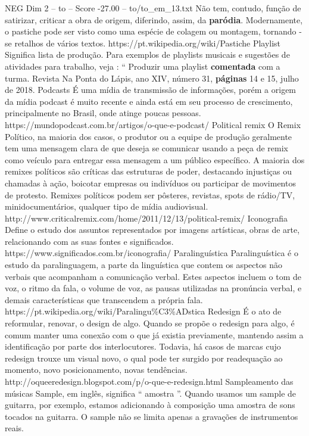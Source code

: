 \begin{textsample}{NEG Dim 2 – to – Score -27.00 – to/to\_em\_13.txt}
Não tem, contudo, função de satirizar, criticar a obra de origem, diferindo, assim, da \textbf{paródia}.
Modernamente, o pastiche pode ser visto como uma espécie de colagem ou montagem, tornando -se retalhos de vários textos. https://pt.wikipedia.org/wiki/Pastiche Playlist Significa lista de produção.
Para exemplos de playlists musicais e sugestões de atividades para trabalho, veja : “ Produzir uma playlist \textbf{comentada} com a turma.
Revista Na Ponta do Lápis, ano XIV, número 31, \textbf{páginas} 14 e 15, julho de 2018.
Podcasts É uma mídia de transmissão de informações, porém a origem da mídia podcast é muito recente e ainda está em seu processo de crescimento, principalmente no Brasil, onde atinge poucas pessoas. https://mundopodcast.com.br/artigos/o-que-e-podcast/ Political remix O Remix Político, na maioria dos casos, o produtor ou a equipe de produção geralmente tem uma mensagem clara de que deseja se comunicar usando a peça de remix como veículo para entregar essa mensagem a um público específico.
A maioria dos remixes políticos são críticas das estruturas de poder, destacando injustiças ou chamadas à ação, boicotar empresas ou indivíduos ou participar de movimentos de protesto.
Remixes políticos podem ser pôsteres, revistas, spots de rádio/TV, minidocumentários, qualquer tipo de mídia audiovisual. http://www.criticalremix.com/home/2011/12/13/political-remix/ Iconografia Define o estudo dos assuntos representados por imagens artísticas, obras de arte, relacionando com as suas fontes e significados. https://www.significados.com.br/iconografia/ Paralinguística Paralinguística é o estudo da paralinguagem, a parte da linguística que contem os aspectos não verbais que acompanham a comunicação verbal.
Estes aspectos incluem o tom de voz, o ritmo da fala, o volume de voz, as pausas utilizadas na pronúncia verbal, e demais características que transcendem a própria fala. https://pt.wikipedia.org/wiki/Paralingu\%C3\%ADstica Redesign É o ato de reformular, renovar, o design de algo.
Quando se propõe o redesign para algo, é comum manter uma conexão com o que já existia previamente, mantendo assim a identificação por parte dos interlocutores.
Todavia, há casos de marcas cujo redesign trouxe um visual novo, o qual pode ter surgido por readequação ao momento, novo posicionamento, novas tendências. http://oqueeredesign.blogspot.com/p/o-que-e-redesign.html Sampleamento das músicas Sample, em inglês, significa “ amostra ”.
Quando usamos um sample de guitarra, por exemplo, estamos adicionando à composição uma amostra de sons tocados na guitarra.
O sample não se limita apenas a gravações de instrumentos reais.

\end{textsample}
